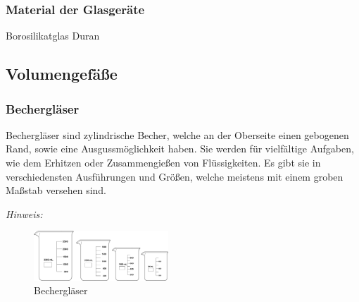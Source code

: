 \subsubsection{Material der Glasgeräte}
Borosilikatglas Duran

\newpage

\subsection{Volumengefäße}
\subsubsection{Bechergläser}
Bechergläser sind zylindrische Becher, welche an der Oberseite einen gebogenen Rand, sowie eine Ausgussmöglichkeit haben. Sie werden für vielfältige Aufgaben, wie dem Erhitzen oder Zusammengießen von Flüssigkeiten. Es gibt sie in verschiedensten Ausführungen und Größen, welche meistens mit einem groben Maßstab versehen sind.\\
\vspace*{-5mm}

\textit{Hinweis:}\\
\vspace*{-5mm}

\begin{figure}[h!]
	\centering
	\includegraphics[width=0.45\textwidth]{img/becherglas}
	\caption{Bechergläser}
	\label{fig:becherglas}
\end{figure}
\FloatBarrier
\vspace*{-10mm}

